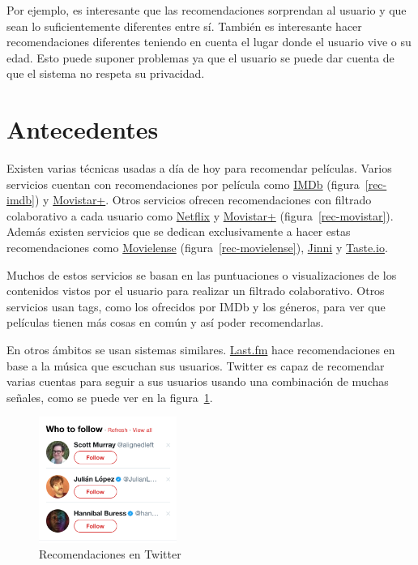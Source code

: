 \documentclass[withindex, glossary]{cam-thesis}
\begin{document}
Por ejemplo, es interesante que las recomendaciones sorprendan\cite{Onuma2009} al usuario y que sean lo suficientemente diferentes entre sí. También es interesante hacer recomendaciones diferentes teniendo en cuenta el lugar donde el usuario vive o su edad. Esto puede suponer problemas ya que el usuario se puede dar cuenta de que el sistema no respeta su privacidad.

\section{Antecedentes}
Existen varias técnicas usadas a día de hoy para recomendar películas. Varios servicios cuentan con recomendaciones por película como \href{http://www.imdb.com}{IMDb} (figura~\ref{rec-imdb}) y \href{http://ver.movistarplus.es}{Movistar+}. Otros servicios ofrecen recomendaciones con filtrado colaborativo a cada usuario como \href{https://netflix.com}{Netflix} y \href{http://ver.movistarplus.es}{Movistar+} (figura~\ref{rec-movistar}). Además existen servicios que se dedican exclusivamente a hacer estas recomendaciones como \href{https://movielens.org/}{Movielense} (figura~\ref{rec-movielense}), \href{http://www.jinni.com/}{Jinni} y \href{https://www.taste.io/}{Taste.io}.

Muchos de estos servicios se basan en las puntuaciones o visualizaciones de los contenidos vistos por el usuario para realizar un filtrado colaborativo. Otros servicios usan tags, como los ofrecidos por IMDb y los géneros, para ver que películas tienen más cosas en común y así poder recomendarlas.

En otros ámbitos se usan sistemas similares. \href{https://www.last.fm/}{Last.fm} hace recomendaciones en base a la música que escuchan sus usuarios. Twitter es capaz de recomendar varias cuentas para seguir a sus usuarios usando una combinación de muchas señales\cite{Gupta:2013:WFS:2488388.2488433}, como se puede ver en la figura~\ref{rec-twitter}.

\begin{figure}[!htbp]
    \centering
    \includegraphics[width=0.4\textwidth]{./figures/rec-twitter.png}
    \caption{Recomendaciones en Twitter}\label{rec-twitter}
\end{figure}
\end{document}
